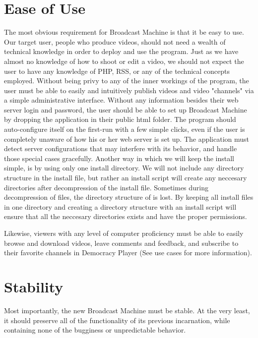 \documentclass[a4paper,12pt]{report}
\begin{document}
\section{Ease of Use}

    The most obvious requirement for Broadcast Machine is that it be easy to use.
Our target user, people who produce videos, should not need a wealth of technical knowledge in order to deploy and use the program.
Just as we have almost no knowledge of how to shoot or edit a video, we should not expect the user to have any knowledge of PHP, RSS, or any of the technical concepts employed.
Without being privy to any of the inner workings of the program, the user must be able to easily and intuitively publish videos and video "channels" via a simple administrative interface.
Without any information besides their web server login and password, the user should be able to set up Broadcast Machine by dropping the application in their public html folder.
The program should auto-configure itself on the first-run with a few simple clicks, even if the user is completely unaware of how his or her web server is set up.
The application must detect server configurations that may interfere with its behavior, and handle those special cases gracefully.
Another way in which we will keep the install simple, is by using only one install directory.
We will not include any directory structure in the install file, but rather an install script will create any neccesary directories after decompression of the install file.
Sometimes during decompression of files, the directory structure of is lost.
By keeping all install files in one directory and creating a directory structure with an install script will ensure that all the neccesary directories exists and have the proper permissions.

Likewise, viewers with any level of computer proficiency must be able to easily browse and download videos, leave comments and feedback, and subscribe to their favorite channels in Democracy Player (See use cases for more information).
 

\section{Stability}

    Most importantly, the new Broadcast Machine must be stable.
At the very least, it should preserve all of the functionality of its previous incarnation, while containing none of the bugginess or unpredictable behavior.
\end{document}
